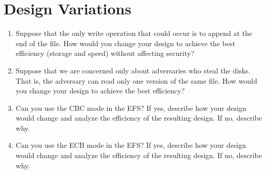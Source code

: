 \documentclass[11pt]{article}
\begin{document}
\section*{Design Variations}

\begin{enumerate}

 \item Suppose that the only write operation that could occur is to append at the end of the file. How would you change your design to achieve the best efficiency (storage and speed) without affecting security?

 \item Suppose that we are concerned only about adversaries who steal the disks. That is, the adversary can read only one version of the same file. How would you change your design to achieve the best efficiency?

 \item Can you use the CBC mode in the EFS? If yes, describe how your design would change and analyze the efficiency of the resulting design. If no, describe why.

 \item Can you use the ECB mode in the EFS? If yes, describe how your design would change and analyze the efficiency of the resulting design. If no, describe why.

\end{enumerate}
\end{document}
